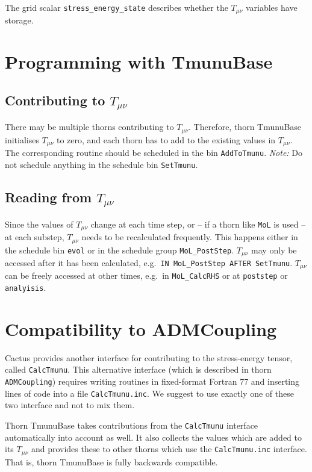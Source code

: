 \documentclass{article}
\begin{document}
The grid scalar \texttt{stress\_energy\_state} describes whether the
$T_{\mu\nu}$ variables have storage.

\section{Programming with TmunuBase}

\subsection{Contributing to $T_{\mu\nu}$}

There may be multiple thorns contributing to $T_{\mu\nu}$.  Therefore,
thorn TmunuBase initialises $T_{\mu\nu}$ to zero, and each thorn has
to add to the existing values in $T_{\mu\nu}$.  The corresponding
routine should be scheduled in the bin \texttt{AddToTmunu}.
\emph{Note:} Do not schedule anything in the schedule bin
\texttt{SetTmunu}.

\subsection{Reading from $T_{\mu\nu}$}

Since the values of $T_{\mu\nu}$ change at each time step, or -- if a
thorn like \texttt{MoL} is used -- at each substep, $T_{\mu\nu}$ needs
to be recalculated frequently.  This happens either in the schedule
bin \texttt{evol} or in the schedule group \texttt{MoL\_PostStep}.
$T_{\mu\nu}$ may only be accessed after it has been calculated, e.g.\
\texttt{IN MoL\_PostStep AFTER SetTmunu}.  $T_{\mu\nu}$ can be freely
accessed at other times, e.g.\ in \texttt{MoL\_CalcRHS} or at
\texttt{poststep} or \texttt{analyisis}.

\section{Compatibility to ADMCoupling}

Cactus provides another interface for contributing to the
stress-energy tensor, called \texttt{CalcTmunu}.  This alternative
interface (which is described in thorn \texttt{ADMCoupling}) requires
writing routines in fixed-format Fortran 77 and inserting lines of
code into a file \texttt{CalcTmunu.inc}.  We suggest to use exactly
one of these two interface and not to mix them.

Thorn TmunuBase takes contributions from the \texttt{CalcTmunu}
interface automatically into account as well.  It also collects the
values which are added to its $T_{\mu\nu}$ and provides these to other
thorns which use the \texttt{CalcTmunu.inc} interface.  That is, thorn
TmunuBase is fully backwards compatible.
\end{document}
